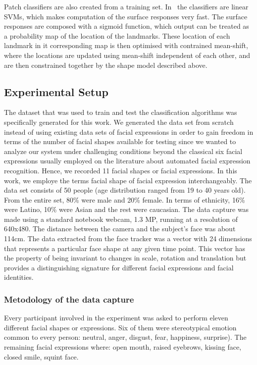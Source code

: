 \documentclass[]{article}
\begin{document}
Patch classifiers are also created from a training
set. In~\cite{saragih2011deformable} the classifiers are linear SVMs,
which makes computation of the surface responses very fast. The
surface responses are composed with a sigmoid function, which output
can be treated as a probability map of the location of the
landmarks. These location of each landmark in it corresponding map is
then optimised with contrained mean-shift, where the locations are
updated using mean-shift independent of each other, and are then
constrained together by the shape model described above.



\subsection{Experimental Setup}
The dataset that was used to train and test the classification algorithms was specifically generated for this work. We
generated the data set from scratch instead of using existing data sets of facial expressions in order to gain freedom
in terms of the number of facial shapes available for testing since we wanted to analyze our system under challenging
conditions beyond the classical six facial expressions usually employed on the literature about automated facial
expression  recognition. Hence, we recorded 11 facial shapes or facial expressions. In this work, we employe the terms
facial shape of facial expression interchangeably. The data set consists of 50 people (age distribution ranged from 19
to 40 years old). From the entire set, 80\% were male and 20\% female. In terms of ethnicity, 16\% were Latino, 10\%
were Asian and the rest were caucasian. The data capture was made using a standard notebook webcam, 1.3 MP, running at a
resolution of 640x480. The distance between the camera and the subject's face was about 114cm. The data extracted from
the face tracker was a vector with 24 dimensions that represents a particular face shape at any given time point. This
vector has the property of being invariant to changes in scale, rotation and translation but provides a distinguishing
signature for different facial expressions and facial identities.


\subsubsection{Metodology of the data capture}
Every participant involved in the experiment was asked to perform eleven different facial shapes or expressions.
Six of them were stereotypical emotion common to every person: neutral, anger, disgust, fear, happiness,
surprise). The remaining facial expressions where: open mouth, raised eyebrows, kissing face, closed smile, squint face.
\end{document}
